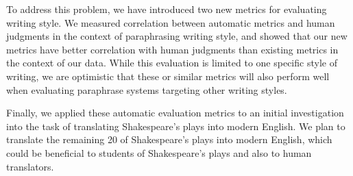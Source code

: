 \documentclass[10pt,a5paper,twoside]{article}
\begin{document}
To address this problem, we have introduced two new metrics for evaluating writing style.
We measured correlation between automatic metrics and human judgments in the context of paraphrasing writing style, and showed
that our new metrics have better correlation with human judgments than existing metrics in the context of our data.
While this evaluation is limited to one specific style of writing, we are optimistic that these or similar metrics will also perform well when
evaluating paraphrase systems targeting other writing styles.

Finally, we applied these automatic evaluation metrics to an initial investigation into the task of translating Shakespeare's plays into modern English.
We plan to translate the remaining 20 of Shakespeare's plays into modern English, which could be beneficial to students
of Shakespeare's plays and also to human translators.




\end{document}
